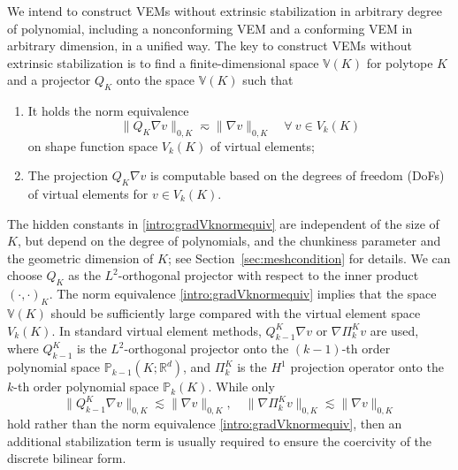 \documentclass[10pt]{amsart}
\numberwithin{equation}{section}
\begin{document}
We intend to construct VEMs without extrinsic stabilization in arbitrary degree of polynomial, including a nonconforming VEM and a conforming VEM in arbitrary dimension,  in a unified way.
The key to construct VEMs without extrinsic stabilization is to find a finite-dimensional space $\mathbb{V}(K)$ for polytope $K$ and a projector $Q_K$ onto the space $\mathbb{V}(K)$ such that
\begin{enumerate}[(C1)]
\item It holds the norm equivalence 
\begin{equation}\label{intro:gradVknormequiv} 
\|Q_{K}\nabla v\|_{0,K}\eqsim \|\nabla v\|_{0,K} \quad \forall~v\in V_k(K)
\end{equation}
on shape function space $V_k(K)$ of virtual elements;
\item The projection $Q_{K}\nabla v$ is computable based on the degrees of freedom (DoFs) of virtual elements for $v\in V_k(K)$.
\end{enumerate}
The hidden constants in \eqref{intro:gradVknormequiv} are independent of the size of $K$, but depend on the degree of polynomials, and the chunkiness parameter and the geometric dimension of $K$; see Section~\ref{sec:meshcondition} for details.
We can choose $Q_{K}$ as the $L^2$-orthogonal projector with respect to the
inner product $(\cdot, \cdot)_K$. The norm equivalence
\eqref{intro:gradVknormequiv} implies that the space $\mathbb{V}(K)$ should be
sufficiently large compared with the virtual element space $V_k(K)$.  In
standard virtual element methods, $Q_{k-1}^{K}\nabla v$
\cite{BeiraodaVeigaBrezziMariniRusso2016} or $\nabla\Pi_k^{K}v$
\cite{BeiraoBrezziCangianiManziniEtAl2013,BeiraoBrezziMariniRusso2014,AhmadAlsaediBrezziMariniEtAl2013,AyusodeDiosLipnikovManzini2016}
are used, where $Q_{k-1}^{K}$ is the $L^2$-orthogonal projector onto the
$(k-1)$-th order polynomial space $\mathbb P_{k-1}(K; \mathbb{R}^d)$, and
$\Pi_k^{K}$ is the $H^1$ projection operator onto the $k$-th order polynomial
space $\mathbb P_{k}(K)$.  While only
\[
\|Q_{k-1}^{K}\nabla v\|_{0,K}\lesssim \|\nabla v\|_{0,K}, \quad \|\nabla\Pi_k^{K}v\|_{0,K}\lesssim \|\nabla v\|_{0,K}
\]
hold
rather than the norm equivalence \eqref{intro:gradVknormequiv}, then an additional stabilization term is usually required to ensure the coercivity of the discrete bilinear form.
\end{document}

